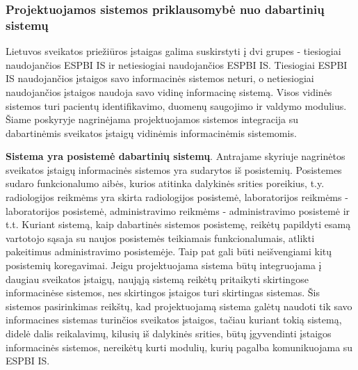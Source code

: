 \subsubsection{Projektuojamos sistemos priklausomybė nuo dabartinių sistemų}
Lietuvos sveikatos priežiūros įstaigas galima suskirstyti į dvi grupes - tiesiogiai naudojančios ESPBI IS ir netiesiogiai naudojančios ESPBI IS. Tiesiogiai ESPBI IS naudojančios įstaigos savo informacinės sistemos neturi, o netiesiogiai naudojančios įstaigos naudoja savo vidinę informacinę sistemą. Visos vidinės sistemos turi pacientų identifikavimo, duomenų saugojimo ir valdymo modulius. Šiame poskyryje nagrinėjama projektuojamos sistemos integracija su dabartinėmis sveikatos įstaigų vidinėmis informacinėmis sistemomis.

\textbf{Sistema yra posistemė dabartinių sistemų}. Antrajame skyriuje nagrinėtos sveikatos įstaigų informacinės sistemos yra sudarytos iš posistemių. Posistemes sudaro funkcionalumo aibės, kurios atitinka dalykinės srities poreikius, t.y. radiologijos reikmėms yra skirta radiologijos posistemė, laboratorijos reikmėms - laboratorijos posistemė, administravimo reikmėms - administravimo posistemė ir t.t. Kuriant sistemą, kaip dabartinės sistemos posistemę, reikėtų papildyti esamą vartotojo sąsaja su naujos posistemės teikiamais funkcionalumais, atlikti pakeitimus administravimo posistemėje. Taip pat gali būti neišvengiami kitų posistemių koregavimai. Jeigu projektuojama sistema būtų integruojama į daugiau sveikatos įstaigų, naująją sistemą reikėtų pritaikyti skirtingose informacinėse sistemos, nes skirtingos įstaigos turi skirtingas sistemas. Šis sistemos pasirinkimas reikštų, kad projektuojamą sistema galėtų naudoti tik savo  informacines sistemas turinčios sveikatos įstaigos, tačiau kuriant tokią sistemą, didelė dalis reikalavimų, kilusių iš dalykinės srities, būtų įgyvendinti įstaigos informacinės sistemos, nereikėtų kurti modulių, kurių pagalba komunikuojama su ESPBI IS.

